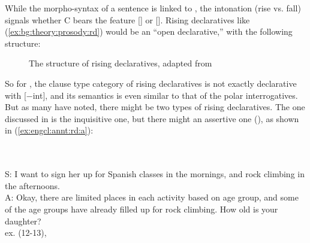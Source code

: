 While the morpho-syntax of a sentence is linked to , the intonation (rise vs. fall) signals whether C bears the feature [] or []. Rising declaratives like (\ref{ex:bg:theory:prosody:rd}) would be an ``open declarative,'' with the following structure:

\begin{figure}[H]
\begin{center}
\end{center}
\caption{The structure of rising declaratives, adapted from \textcite{farkasroelofsen2017}}
\label{fig:bg:fb2017rd}
\end{figure}

So for \textcite{farkasroelofsen2017}, the clause type category of rising declaratives is not exactly declarative with [$-$int], and its semantics is even similar to that of the polar interrogatives. But as many have noted, there might be two types of rising declaratives. The one discussed in \textcite{farkasroelofsen2017} is the inquisitive one, but there might an assertive one (\cite{jeong2018, goodhue2021rd}), as shown in (\ref{ex:engcl:annt:rd:a}):

\bxl
\label{ex:engcl:annt:rd:q}
\\
\ex
\label{ex:engcl:annt:rd:a}
\\
S: I want to sign her up for Spanish classes in the mornings, and rock climbing in the afternoons.\\
A: Okay, there are limited places in each activity based on age group, and some of the age groups have already filled up for rock climbing. How old is your daughter?\\
\exl
\hspace*{\fill}\hfill ex. (12-13), \cite[p.955]{goodhue2021rd}
\eex

